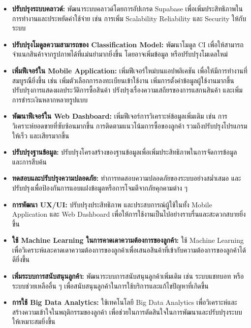  \begin{itemize}
    \item \textbf{ปรับปรุงระบบคลาวด์:} พัฒนาระบบคลาวด์โดยการอัปเกรด Supabase เพื่อเพิ่มประสิทธิภาพในการทำงานและประหยัดค่าใช้จ่าย เช่น การเพิ่ม Scalability Reliability และ Security ให้กับระบบ
    \item \textbf{ปรับปรุงโมดูลความสามารถของ Classification Model:} พัฒนาโมดูล CI เพื่อให้สามารถจำแนกสินค้าจากรูปภาพได้ที่แม่นยำมากยิ่งขึ้น โดยอาจเพิ่มข้อมูล หรือปรับปรุงโมเดลใหม่
    \item \textbf{เพิ่มฟีเจอร์ใน Mobile Application:} เพิ่มฟีเจอร์ใหม่บนแอปพลิเคชัน เพื่อให้มีการทำงานที่สมบูรณืยิ่งขึ้น เช่น เพิ่มตัวเลือกการลงทะเบียนเข้าใช้งาน เพิ่มการตั้งค่าข้อมูลผู้ใช้งานมากขึ้น ปรับปรุงการแสดงผลประวัติการซื้อสินค้า ปรังปรุงเรื่องความเสถียรของการแสกนสินค้า และเพิ่มการชำระเงินหลากหลายรูปแบบ
    \item \textbf{พัฒนาฟีเจอร์ใน Web Dashboard:} เพิ่มฟีเจอร์การวิเคราะห์ข้อมูลเพิ่มเติม เช่น การวิเคราะห์ยอดขายที่ซับซ้อนมากขึ้น การติดตามแนวโน้มการซื้อของลูกค้า รวมถึงปรับปรุงโปรแกรมให้เร็ว และเสียรมากขึ้น
    \item \textbf{ปรับปรุงฐานข้อมูล:} ปรับปรุงโครงสร้างของฐานข้อมูลเพื่อเพิ่มประสิทธิภาพในการจัดการข้อมูล และการสืบค้น
    \item \textbf{ทดสอบและปรับปรุงความปลอดภัย:} ทำการทดสอบความปลอดภัยของระบบอย่างสม่ำเสมอ และปรับปรุงเพื่อป้องกันการแอบแฝงข้อมูลหรือการโจมตีจากภัยคุกคามต่าง ๆ
    \item \textbf{การพัฒนา UX/UI:} ปรับปรุงประสิทธิภาพ และประสบการณ์ผู้ใช้ในทั้ง Mobile Application และ Web Dashboard เพื่อให้การใช้งานเป็นไปอย่างราบรื่นและสะดวกสบายยิ่งขึ้น 
    \item \textbf{ใช้ Machine Learning ในการคาดเดาความต้องการของลูกค้า:} ใช้ Machine Learning เพื่อวิเคราะห์และคาดเดาความต้องการของลูกค้าเพื่อเสนอสินค้าที่เข้ากับความต้องการของลูกค้าได้ดียิ่งขึ้น
    \item \textbf{เพิ่มระบบการสนับสนุนลูกค้า:} พัฒนาระบบการสนับสนุนลูกค้าเพิ่มเติม เช่น ระบบแชทบอท หรือระบบช่วยเหลืออื่น ๆ เพื่อสนับสนุนลูกค้าในการใช้บริการและแก้ไขปัญหาที่เกิดขึ้น
    \item \textbf{การใช้ Big Data Analytics:} ใช้เทคโนโลยี Big Data Analytics เพื่อวิเคราะห์และสร้างความเข้าใจในพฤติกรรมของลูกค้า เพื่อช่วยในการตัดสินใจในการพัฒนาและปรับปรุงระบบให้เหมาะสมยิ่งขึ้น
\end{itemize}

